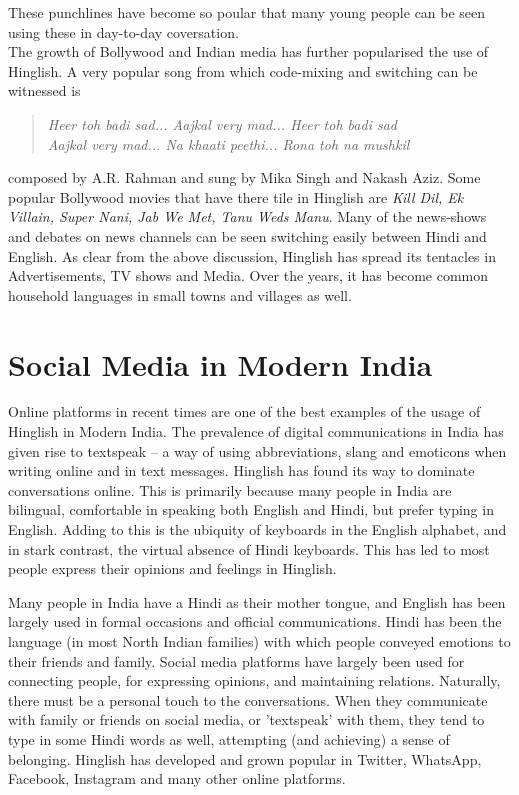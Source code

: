 \documentclass{article}
\begin{document}
These punchlines have become so poular that many young people can be seen using these in day-to-day coversation.\\
The growth of Bollywood and Indian media has further popularised the use of Hinglish. A very popular song from which code-mixing and switching can be witnessed is 
\begin{quote}
    \centering
    \textit{Heer toh badi sad... Aajkal very mad... Heer toh badi sad \\
    Aajkal very mad... Na khaati peethi... Rona toh na mushkil}
\end{quote}
composed by A.R. Rahman and sung by Mika Singh and Nakash Aziz. Some popular Bollywood movies that have there tile in Hinglish are \textit{Kill Dil, Ek Villain, Super Nani, Jab We Met, Tanu Weds Manu}. Many of the news-shows and debates on news channels can be seen switching easily between Hindi and English. As clear from the above discussion, Hinglish has spread its tentacles in Advertisements, TV shows and Media. Over the years, it has become common household languages in small towns and villages as well.

\section {Social Media in Modern India}
Online platforms in recent times are one of the best examples of the usage of Hinglish in Modern India. The prevalence of digital communications in India has given rise to textspeak – a way of using abbreviations, slang and emoticons when writing online and in text messages. Hinglish has found its way to dominate conversations online. This is primarily because many people in India are bilingual, comfortable in speaking both English and Hindi, but prefer typing in English. Adding to this is the ubiquity of keyboards in the English alphabet, and in stark contrast, the virtual absence of Hindi keyboards. This has led to most people express their opinions and feelings in Hinglish. 

Many people in India have a Hindi as their mother tongue, and English has been largely used in formal occasions and official communications. Hindi has been the language (in most North Indian families) with which people conveyed emotions to their friends and family. Social media platforms have largely been used for connecting people, for expressing opinions, and maintaining relations. Naturally, there must be a personal touch to the conversations. When they communicate with family or friends on social media, or 'textspeak' with them, they tend to type in some Hindi words as well, attempting (and achieving) a sense of belonging. Hinglish has developed and grown popular in Twitter, WhatsApp, Facebook, Instagram and many other online platforms.
\end{document}
